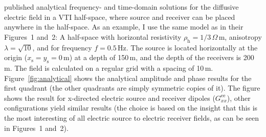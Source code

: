 \documentclass[manuscript,revised]{geophysics}
\begin{document}
\cite{PIER.10.Slob} published analytical frequency- and time-domain solutions
for the diffusive electric field in a VTI half-space, where source and receiver
can be placed anywhere in the half-space. As an example, I use the same model
as \cite{GEO.15.Hunziker} in their Figures~1 and~2: A half-space with
horizontal resistivity $\rho_\mathrm{h} = 1/3\,\Omega$\,m, anisotropy $\lambda
= \sqrt{10}$, and for frequency $f = 0.5\,$Hz. The source is located
horizontally at the origin ($x_\mathrm{s} = y_\mathrm{s} = 0\,$m) at a depth of
150\,m, and the depth of the receivers is 200\,m. The field is calculated on a
regular grid with a spacing of 10\,m. Figure~\ref{fig:analytical} shows the
analytical amplitude and phase results for the first quadrant (the other
quadrants are simply symmetric copies of it).
%
%
The figure shows the result for x-directed electric source and receiver dipoles
($G^\mathrm{ee}_{xx}$), other configurations yield similar results (the choice
is based on the insight that this is the most interesting of all electric
source to electric receiver fields, as can be seen in \cite{GEO.15.Hunziker}
Figures~1 and~2).
\end{document}
